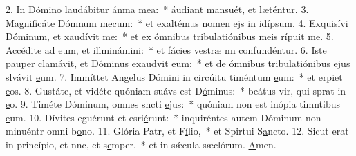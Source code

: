 2. In Dómino laudábitur ánma m\uline{e}a:~* áudiant mansuét, et læt\uline{é}ntur.
3. Magnificáte Dómnum m\uline{e}cum:~* et exaltémus nomen ejs in id\uline{í}psum.
4. Exquisívi Dóminum, et xaud\uline{í}vit me:~* et ex ómnibus tribulatiónibus meis rípu\uline{i}t me.
5. Accédite ad eum, et illmin\uline{á}mini:~* et fácies vestræ nn confund\uline{é}ntur.
6. Iste pauper clamávit, et Dóminus exaudvit \uline{e}um:~* et de ómnibus tribulatiónibus ejus slvávit \uline{e}um.
7. Immíttet Angelus Dómini in circúitu timéntum \uline{e}um:~* et erpiet \uline{e}os.
8. Gustáte, et vidéte quóniam suávs est D\uline{ó}minus:~* beátus vir, qui sprat in \uline{e}o.
9. Timéte Dóminum, omnes sncti \uline{e}jus:~* quóniam non est inópia timntibus \uline{e}um.
10. Dívites eguérunt et esri\uline{é}runt:~* inquiréntes autem Dóminum non minuéntr omni b\uline{o}no.
11. Glória Patr, et F\uline{í}lio,~* et Spirtui S\uline{a}ncto.
12. Sicut erat in princípio, et nnc, et s\uline{e}mper,~* et in sǽcula sæclórum. \uline{A}men.
